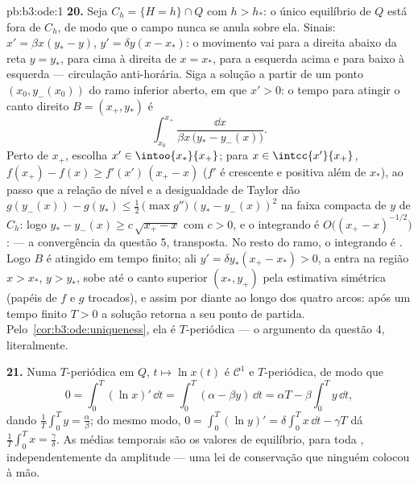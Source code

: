 \begin{solution}{pb:b3:ode:1}
\textbf{20.} Seja $C_h = \{H = h\}\cap Q$ com $h > h_*$: o
único equilíbrio de $Q$ está fora de $C_h$, de modo que o campo nunca
se anula sobre ela. Sinais: $x' = \beta x(y_* - y)$, $y' =
\delta y(x - x_*)$: o movimento vai para a direita abaixo da reta $y
= y_*$, para cima à direita de $x = x_*$, para a esquerda acima e para baixo
à esquerda --- circulação anti-horária. Siga a
solução a partir de um ponto $(x_0, y_-(x_0))$ do ramo inferior aberto,
em que $x' > 0$: o tempo para atingir o canto direito
$B = (x_+, y_*)$ é
\[
\int_{x_0}^{x_+}\frac{\dd x}{\beta x\,\bigl(y_* -
y_-(x)\bigr)} .
\]
Perto de $x_+$, escolha $x' \in \intoo{x_*}{x_+}$; para $x \in
\intcc{x'}{x_+}$, $f(x_+) - f(x) \geq f'(x')\,(x_+ - x)$
($f'$ é crescente e positiva além de $x_*$), ao passo que a
relação de nível e a desigualdade de Taylor dão $g(y_-(x)) -
g(y_*) \leq \frac12\,\bigl(\max g''\bigr)\,(y_* -
y_-(x))^2$ na faixa compacta de $y$ de $C_h$: logo $y_* -
y_-(x) \geq c\,\sqrt{x_+ - x}$ com $c > 0$, e o
integrando é $O\bigl((x_+ - x)^{-1/2}\bigr)$:  ---
a convergência da questão 5, transposta. No resto do
ramo, o integrando é . Logo $B$ é atingido em
tempo finito; ali $y' = \delta y_*(x_+ - x_*) > 0$, a
 entra na região $x > x_*$, $y > y_*$, sobe até o
canto superior $(x_*, y_+)$ pela estimativa simétrica (papéis de
$f$ e $g$ trocados), e assim por diante ao longo dos quatro arcos:
após um tempo finito $T > 0$ a solução retorna a seu
ponto de partida. Pelo~\cref{cor:b3:ode:uniqueness}, ela é
$T$-periódica --- o argumento da questão 4, literalmente.

\textbf{21.} Numa  $T$-periódica em $Q$, $t \mapsto \ln
x(t)$ é $\mathcal C^1$ e $T$-periódica, de modo que
\[
0 = \int_0^T(\ln x)'\,\dd t
= \int_0^T(\alpha - \beta y)\,\dd t
= \alpha T - \beta\int_0^Ty\,\dd t ,
\]
dando $\frac1T\int_0^Ty = \frac\alpha\beta$; do mesmo modo, $0 =
\int_0^T(\ln y)' = \delta\int_0^Tx\,\dd t - \gamma T$ dá
$\frac1T\int_0^Tx = \frac\gamma\delta$. As médias temporais
são os valores de equilíbrio, para toda , independentemente da
amplitude --- uma lei de conservação que ninguém colocou à mão.


\end{solution}
